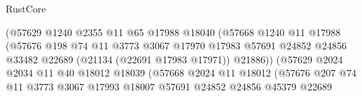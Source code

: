 \begin{lexlean}{RustCore}
\begin{coremodule}
                                        (@57629
                                          @1240
                                          @2355
                                          @11
                                          @65
                                          @17988
                                          @18040
                                          (@57668
                                            @1240
                                            @11
                                            @17988
                                            (@57676
                                              @198
                                              @74
                                              @11
                                              @3773
                                              @3067
                                              @17970
                                              @17983
                                              @57691
                                              @24852
                                              @24856
                                              @33482
                                              @22689
                                              (@21134 (@22691 @17983 @17971))
                                              @21886))
                                          (@57629
                                            @2024
                                            @2034
                                            @11
                                            @40
                                            @18012
                                            @18039
                                            (@57668
                                              @2024
                                              @11
                                              @18012
                                              (@57676
                                                @207
                                                @74
                                                @11
                                                @3773
                                                @3067
                                                @17993
                                                @18007
                                                @57691
                                                @24852
                                                @24856
                                                @45379
                                                @22689

\end{coremodule}
\end{lexlean}
